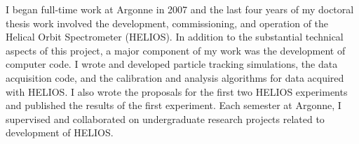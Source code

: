{I began full-time work at Argonne in %
 2007 and the last four years of my doctoral thesis work involved the
 development, commissioning, and operation of the Helical Orbit Spectrometer (HELIOS).
In addition to the substantial technical aspects of this project,
 a major component of my work was the development of computer code. %
I wrote and developed particle tracking simulations, %
 the data acquisition code, and %
 the calibration and analysis algorithms for data acquired with HELIOS. 
 I also wrote the proposals for the first two HELIOS experiments and published the results of the first experiment.
Each semester at Argonne, I supervised and collaborated on undergraduate research projects related to development of HELIOS.

}
